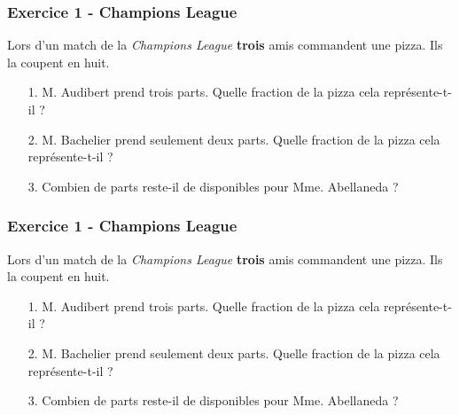 \documentclass[12pt]{article}
\begin{document}

\subsubsection*{Exercice 1 - Champions League}
Lors d'un match de la \textit{Champions League} \textbf{trois} amis commandent une pizza. Ils la coupent en huit. 

\begin{enumerate}
\item[1.] M. Audibert prend trois parts. Quelle fraction de la pizza cela représente-t-il ?
\vspace{2cm}
\item[2.] M. Bachelier prend seulement deux parts. Quelle fraction de la pizza cela représente-t-il ?
\vspace{2cm}
\item[3.] Combien de parts reste-il de disponibles pour Mme. Abellaneda ?
\vspace{2cm}
\end{enumerate}

\vspace{1cm}
\noindent\hrulefill
\vspace{1cm}

\subsubsection*{Exercice 1 - Champions League}
Lors d'un match de la \textit{Champions League} \textbf{trois} amis commandent une pizza. Ils la coupent en huit. 

\begin{enumerate}
\item[1.] M. Audibert prend trois parts. Quelle fraction de la pizza cela représente-t-il ?
\vspace{2cm}
\item[2.] M. Bachelier prend seulement deux parts. Quelle fraction de la pizza cela représente-t-il ?
\vspace{2cm}
\item[3.] Combien de parts reste-il de disponibles pour Mme. Abellaneda ?
\vspace{2cm}
\end{enumerate}
\end{document}
